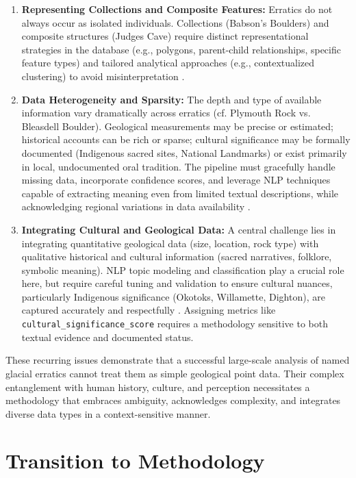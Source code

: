 \documentclass[
11pt, %
english, %
singlespacing, %
headsepline, %
]{MastersDoctoralThesis} %
\begin{document}
\begin{enumerate}
    \item \textbf{Representing Collections and Composite Features:} Erratics do not always occur as isolated individuals. Collections (Babson's Boulders) and composite structures (Judges Cave) require distinct representational strategies in the database (e.g., polygons, parent-child relationships, specific feature types) and tailored analytical approaches (e.g., contextualized clustering) to avoid misinterpretation \cite{wburMysteriousBoulders, Dana1891}.
    \item \textbf{Data Heterogeneity and Sparsity:} The depth and type of available information vary dramatically across erratics (cf. Plymouth Rock vs. Bleasdell Boulder). Geological measurements may be precise or estimated; historical accounts can be rich or sparse; cultural significance may be formally documented (Indigenous sacred sites, National Landmarks) or exist primarily in local, undocumented oral tradition. The pipeline must gracefully handle missing data, incorporate confidence scores, and leverage NLP techniques capable of extracting meaning even from limited textual descriptions, while acknowledging regional variations in data availability \cite{LTCBleasdell, Delcourt1991}.
    \item \textbf{Integrating Cultural and Geological Data:} A central challenge lies in integrating quantitative geological data (size, location, rock type) with qualitative historical and cultural information (sacred narratives, folklore, symbolic meaning). NLP topic modeling and classification play a crucial role here, but require careful tuning and validation to ensure cultural nuances, particularly Indigenous significance (Okotoks, Willamette, Dighton), are captured accurately and respectfully \cite{Delcourt1991, Klassen1995, ourtimebdTomanowosMeteorite, statesmanjournalPiecesSacred}. Assigning metrics like \texttt{cultural\_significance\_score} requires a methodology sensitive to both textual evidence and documented status.
\end{enumerate}

These recurring issues demonstrate that a successful large-scale analysis of named glacial erratics cannot treat them as simple geological point data. Their complex entanglement with human history, culture, and perception necessitates a methodology that embraces ambiguity, acknowledges complexity, and integrates diverse data types in a context-sensitive manner.

\section{Transition to Methodology}
\label{sec:transition}
\end{document}
